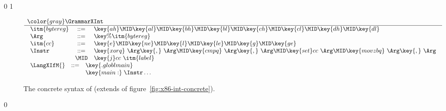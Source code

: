 \documentclass[7x10]{TimesAPriori_MIT}%
\newcommand{\gray}[1]{{\color{gray} #1}}
\def\xeightysixEd{0}
\def\riscvEd{1}
\def\architecture{1}
\numberwithin{theorem}{chapter}
\numberwithin{definition}{chapter}
\numberwithin{equation}{chapter}
\begin{document}
\if\architecture\xeightysixEd
\newcommand{\GrammarXIf}{
\begin{array}{lcl}
  \itm{bytereg} &::=& \key{ah} \MID \key{al} \MID \key{bh} \MID \key{bl}
    \MID \key{ch} \MID \key{cl} \MID \key{dh} \MID \key{dl} \\
\Arg &::=& \key{\%}\itm{bytereg}\\
\itm{cc} & ::= & \key{e} \MID \key{ne} \MID \key{l} \MID \key{le} \MID \key{g} \MID \key{ge} \\
\Instr &::=& \key{xorq}~\Arg\key{,}~\Arg
   \MID \key{cmpq}~\Arg\key{,}~\Arg
    \MID  \key{set}cc~\Arg 
    \MID \key{movzbq}~\Arg\key{,}~\Arg \\
    &\MID& \key{j}cc~\itm{label} \\
\end{array}
}
\fi
\if\architecture\riscvEd
\newcommand{\GrammarXIf}{
\begin{array}{lcl}
\itm{cc} & ::= & \key{eq} \MID \key{ne} \MID \key{lt} \MID \key{ge} \\
  \Instr &::=&
               \key{s}cc\key{z} ~\Arg\key{,}~\Arg \MID
               \key{b}cc ~\Arg\key{,}~\Arg\key{,}~\itm{label} \\
\end{array}
}\fi

\begin{figure}[tp]
\begin{tcolorbox}[colback=white]
\[
\begin{array}{l}
  \gray{\GrammarXInt} \\ \hline
  \GrammarXIf \\ 
\begin{array}{lcl}
\LangXIfM{} &::= &  \key{.globl main} \\
      &    & \key{main:} \; \Instr\ldots 
\end{array}
\end{array}
\]
\end{tcolorbox}
\caption{The concrete syntax of \LangXIf{}  (extends \LangXInt{} of figure~\ref{fig:x86-int-concrete}).}
\label{fig:x86-1-concrete}
\end{figure}

\if\architecture\xeightysixEd
\newcommand{\ASTXIfRacket}{
\begin{array}{lcl}
\itm{bytereg} &::=& \key{ah} \MID \key{al} \MID \key{bh} \MID \key{bl}
    \MID \key{ch} \MID \key{cl} \MID \key{dh} \MID \key{dl} \\
\Arg &::=&  \BYTEREG{\itm{bytereg}} \\
\itm{cc} & ::= & \key{e} \MID \key{l} \MID \key{le} \MID \key{g} \MID \key{ge} \\
\Instr &::=& \BININSTR{\code{xorq}}{\Arg}{\Arg}
       \MID \BININSTR{\code{cmpq}}{\Arg}{\Arg}\\
       &\MID& \BININSTR{\code{set}}{\itm{cc}}{\Arg} 
       \MID \BININSTR{\code{movzbq}}{\Arg}{\Arg}\\
       &\MID&  \JMPIF{\itm{cc}}{\itm{label}} 
\end{array}
}
\end{document}

